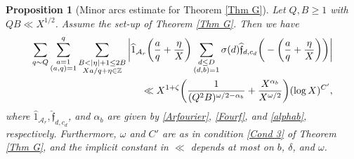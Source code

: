 \documentclass[12pt]{amsart}
\numberwithin{equation}{section}
\newtheorem{prop}[theorem]{Proposition}
\theoremstyle{remark}
\theoremstyle{definition}
\begin{document}
\begin{prop}[Minor arcs estimate for Theorem \ref{Thm G}]\label{PropMinorArc1}
Let $Q, B\geq 1$ with $QB \ll X^{1/2}$. Assume the set-up of Theorem \ref{Thm G}. Then we have
\begin{align}
\notag  \sum_{q\sim Q}\sum_{\substack{a=1\\(a,q)=1}}^q\sum_{\substack{B< |\eta|+1\leq 2B\\X a/q+\eta \in \mathbb{Z}}}\bigg|\widehat{1}_{\mathcal{A}_r}\bigg(\frac{a}{q}+\frac{\eta}{X}\bigg)\sum_{\substack{d\leq D\\(d, b)=1}}{\sigma}(d)\widehat{\mathfrak{f}}_{d, c_d}\bigg(-\bigg(\frac{a}{q}+\frac{\eta}{X}\bigg)\bigg)\bigg|\\
\notag \ll X^{1+\zeta}\bigg(\dfrac{1}{(Q^2B)^{\omega/2-\alpha_b}} + \dfrac{X^{\alpha_b}}{X^{\omega/2}}\bigg)(\log X)^{C'},
\end{align}
where $\widehat{1}_{\mathcal{A}_r}, \widehat{\mathfrak{f}}_{d, c_d}$, and $\alpha_b$ are given by \eqref{Arfourier}, \eqref{Fourf}, and \eqref{alphab}, respectively. Furthermore, $\omega$ and $C'$ are as in condition \ref{Cond 3} of Theorem \ref{Thm G}, and  the implicit constant in $\ll$ depends at most on $b$, $\delta$, and $\omega$.

\end{prop}
\end{document}
